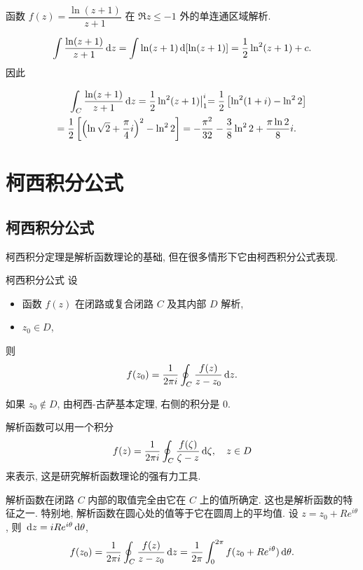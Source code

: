 \begin{solution}
	函数 $f(z)=\dfrac{\ln(z+1)}{z+1}$ 在 $\Re z\le -1$ 外的单连通区域解析.

	{
		\[\int\frac{\ln(z+1)}{z+1}\,\mathrm{d} z
		=\int\ln(z+1)\,\mathrm{d}[\ln(z+1)]=\frac{1}{2}\ln^2(z+1)+c.\]因此

		\begin{align*}
		&\peq\int_C\frac{\ln(z+1)}{z+1}\diff z=\half\ln^2(z+1)\big|_1^i
		{=\half\left[\ln^2(1+i)-\ln^22\right]}\\
		&{=\half\left[\left(\ln\sqrt2+\frac\pi4i\right)^2-\ln^22\right]
		=-\frac{\pi^2}{32}-\frac38\ln^22+\frac{\pi\ln2}{8}i.}
		\end{align*}}
\end{solution}

\section{柯西积分公式}

\subsection{柯西积分公式}

柯西积分定理是解析函数理论的基础, 但在很多情形下它由柯西积分公式表现.

\begin{alertblock}{柯西积分公式}
	设
	\begin{itemize}
		\item 函数 $f(z)$ 在闭路或复合闭路 $C$ 及其内部 $D$ 解析,
		\item $z_0\in D$,
	\end{itemize}
	则
		\[f(z_0)=\frac1{2\pi i}\oint_C\frac{f(z)}{z-z_0}\,\mathrm{d} z.\]
\end{alertblock}

如果 $z_0\notin D$, 由柯西-古萨基本定理, 右侧的积分是 $0$.

解析函数可以用一个积分
\[f(z)=\frac1{2\pi i}\oint_C\frac{f(\zeta)}{\zeta-z}\,\mathrm{d}\zeta,\quad z\in D\]
来表示, 这是研究解析函数理论的强有力工具.

解析函数在闭路 $C$ 内部的取值完全由它在 $C$ 上的值所确定. 这也是解析函数的特征之一.
特别地, 解析函数在圆心处的值等于它在圆周上的平均值.
设 $z=z_0+Re^{i\theta}$, 则 $\,\mathrm{d} z=iRe^{i\theta}\,\mathrm{d}\theta$,
\[f(z_0)=\frac1{2\pi i}\oint_C\frac{f(z)}{z-z_0}\,\mathrm{d} z=\frac1{2\pi}\int_0^{2\pi}f(z_0+Re^{i\theta})\,\mathrm{d}\theta.\]

